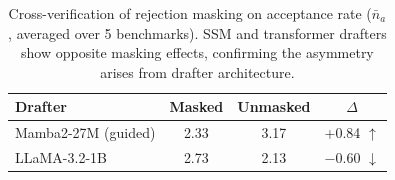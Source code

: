 \begin{table}[t]
\centering
\caption{Cross-verification of rejection masking on acceptance rate ($\bar{n}_a$, averaged over 5 benchmarks). SSM and transformer drafters show opposite masking effects, confirming the asymmetry arises from drafter architecture.}
\label{tab:mask_cross}
\vspace{0.5em}
\begin{tabular}{@{}lccc@{}}
\toprule
\textbf{Drafter} & \textbf{Masked} & \textbf{Unmasked} & \textbf{$\Delta$} \\
\midrule
Mamba2-27M (guided) & 2.33 & 3.17 & +0.84 $\uparrow$ \\
LLaMA-3.2-1B       & 2.73 & 2.13 & $-$0.60 $\downarrow$ \\
\bottomrule
\end{tabular}
\end{table}
